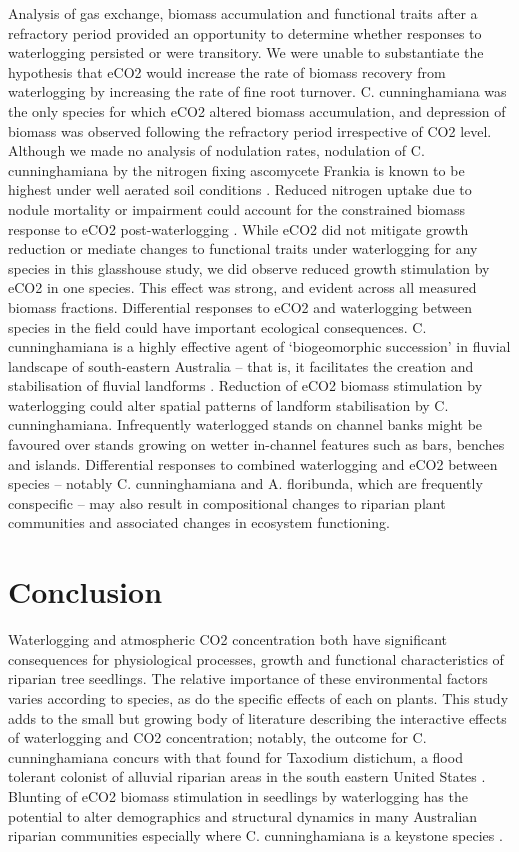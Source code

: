 \documentclass[12pt,a4paper]{memoir}
\begin{document}
Analysis of gas exchange, biomass accumulation and functional traits after a refractory period provided an opportunity to determine whether responses to waterlogging persisted or were transitory. We were unable to substantiate the hypothesis that eCO2 would increase the rate of biomass recovery from waterlogging by increasing the rate of fine root turnover. C. cunninghamiana was the only species for which eCO2 altered biomass accumulation, and depression of biomass was observed following the refractory period irrespective of CO2 level. Although we made no analysis of nodulation rates, nodulation of C. cunninghamiana by the nitrogen fixing ascomycete Frankia is known to be highest under well aerated soil conditions \citep{Dawson1989}. Reduced nitrogen uptake due to nodule mortality or impairment could account for the constrained biomass response to eCO2 post-waterlogging \citep{Reich2006}. While eCO2 did not mitigate growth reduction or mediate changes to functional traits under waterlogging for any species in this glasshouse study, we did observe reduced growth stimulation by eCO2 in one species. This effect was strong, and evident across all measured biomass fractions. Differential responses to eCO2 and waterlogging between species in the field could have important ecological consequences. C. cunninghamiana is a highly effective agent of ‘biogeomorphic succession’ in fluvial landscape of south-eastern Australia – that is, it facilitates the creation and stabilisation of fluvial landforms \citep{Erskine2009}. Reduction of eCO2 biomass stimulation by waterlogging could alter spatial patterns of landform stabilisation by C. cunninghamiana. Infrequently waterlogged stands on channel banks might be favoured over stands growing on wetter in-channel features such as bars, benches and islands. Differential responses to combined waterlogging and eCO2 between species – notably C. cunninghamiana and A. floribunda, which are frequently conspecific – may also result in compositional changes to riparian plant communities and associated changes in ecosystem functioning.

\section{Conclusion}
Waterlogging and atmospheric CO2 concentration both have significant consequences for physiological processes, growth and functional characteristics of riparian tree seedlings. The relative importance of these environmental factors varies according to species, as do the specific effects of each on plants. This study adds to the small but growing body of literature describing the interactive effects of waterlogging and CO2 concentration; notably, the outcome for C. cunninghamiana concurs with that found for Taxodium distichum, a flood tolerant colonist of alluvial riparian areas in the south eastern United States \citep{Megonigal2005}. Blunting of eCO2 biomass stimulation in seedlings by waterlogging has the potential to alter demographics and structural dynamics in many Australian riparian communities especially where C. cunninghamiana is a keystone species \citep{Woolfrey2001}.
\end{document}
